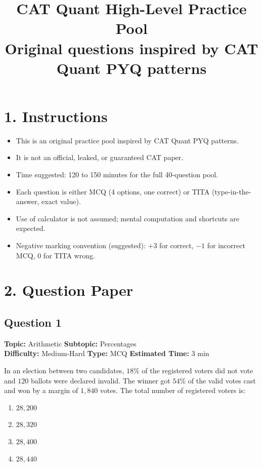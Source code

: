 \documentclass[11pt]{article}
\title{\textbf{CAT Quant High-Level Practice Pool}\\[0.4em]\large Original questions inspired by CAT Quant PYQ patterns}
\author{}
\date{}
\begin{document}
\maketitle

\section*{1. Instructions}

\begin{itemize}[leftmargin=1.2em]
    \item This is an original practice pool inspired by CAT Quant PYQ patterns.
    \item It is not an official, leaked, or guaranteed CAT paper.
    \item Time suggested: 120 to 150 minutes for the full 40-question pool.
    \item Each question is either MCQ (4 options, one correct) or TITA (type-in-the-answer, exact value).
    \item Use of calculator is not assumed; mental computation and shortcuts are expected.
    \item Negative marking convention (suggested): \(+3\) for correct, \(-1\) for incorrect MCQ, \(0\) for TITA wrong.
\end{itemize}

\newpage
\section*{2. Question Paper}

\subsection*{Question 1}
\textbf{Topic:} Arithmetic \quad \textbf{Subtopic:} Percentages \\
\textbf{Difficulty:} Medium-Hard \quad \textbf{Type:} MCQ \quad \textbf{Estimated Time:} 3 min

\begin{tcolorbox}
In an election between two candidates, \(18\%\) of the registered voters did not vote and \(120\) ballots were declared invalid. The winner got \(54\%\) of the valid votes cast and won by a margin of \(1{,}840\) votes. The total number of registered voters is:
\end{tcolorbox}

\begin{enumerate}[label=(\Alph*)]
    \item \(28{,}200\)
    \item \(28{,}320\)
    \item \(28{,}400\)
    \item \(28{,}440\)
\end{enumerate}
\end{document}
